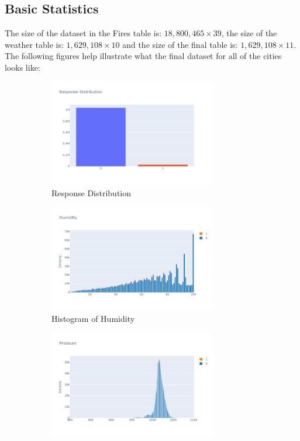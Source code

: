 \documentclass[10pt]{article}
\begin{document}
\subsection{Basic Statistics}
The size of the dataset in the Fires table is: $18,800,465\times 39$,
the size of the weather table is: $1,629,108\times 10$ and
the size of the final table is: $1,629,108\times 11$. The following
figures help illustrate what the final dataset for all of the cities looks
like:\par
\begin{figure}[H]
    \centering
    \begin{subfigure}[t]{0.48\textwidth}
        \centering
        \includegraphics[width=0.8\textwidth]{../res/eda1.png}
        \caption{Response Distribution}
    \end{subfigure}
    \begin{subfigure}[t]{0.48\textwidth}
        \centering
        \includegraphics[width=0.8\textwidth]{../res/eda2.png}
        \caption{Histogram of Humidity}
    \end{subfigure}
    \begin{subfigure}[t]{0.48\textwidth}
        \centering
        \includegraphics[width=0.8\textwidth]{../res/eda3.png}

\end{subfigure}
\end{figure}
\end{document}
